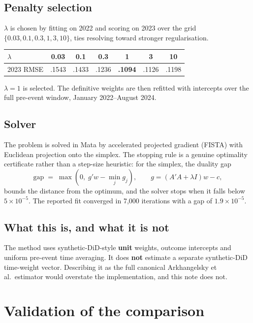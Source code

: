 \documentclass[11pt,a4paper]{article}
\begin{document}
\subsection{Penalty selection}

$\lambda$ is chosen by fitting on 2022 and scoring on 2023 over the grid
$\{0.03,0.1,0.3,1,3,10\}$, ties resolving toward stronger regularisation.

\begin{center}
\small
\begin{tabular}{@{}lcccccc@{}}
\toprule
$\lambda$ & 0.03 & 0.1 & 0.3 & \textbf{1} & 3 & 10 \\
\midrule
2023 RMSE & .1543 & .1433 & .1236 & \textbf{.1094} & .1126 & .1198 \\
\bottomrule
\end{tabular}
\end{center}

\noindent $\lambda=1$ is selected. The definitive weights are then refitted
with intercepts over the full pre-event window, January 2022--August 2024.

\subsection{Solver}

The problem is solved in Mata by accelerated projected gradient (FISTA) with
Euclidean projection onto the simplex. The stopping rule is a genuine
optimality certificate rather than a step-size heuristic: for the simplex, the
duality gap
\[
\text{gap} \;=\; \max\!\left(0,\; g'w - \min_j g_j\right),
\qquad g = (A'A + \lambda I)w - c,
\]
bounds the distance from the optimum, and the solver stops when it falls below
$5\times10^{-5}$. The reported fit converged in 7{,}000 iterations with a gap
of $1.9\times10^{-5}$.

\subsection{What this is, and what it is not}

The method uses synthetic-DiD-style \textbf{unit} weights, outcome intercepts
and uniform pre-event time averaging. It does \textbf{not} estimate a separate
synthetic-DiD time-weight vector. Describing it as the full canonical
Arkhangelsky et al.\ estimator would overstate the implementation, and this
note does not.

\section{Validation of the comparison}
\end{document}
